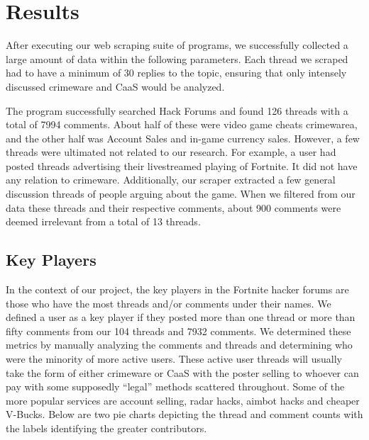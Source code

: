 \documentclass[sigconf]{acmart}
\begin{document}
\section{Results}

After executing our web scraping suite of programs, we successfully collected
a large amount of data within the following parameters. Each thread we scraped
had to have a minimum of 30 replies to the topic, ensuring that only intensely
discussed crimeware and CaaS would be analyzed. 

The program successfully searched Hack Forums and found 126 threads with a total
of 7994 comments. About half of these were video game cheats crimewarea, and the
other half was Account Sales and in-game currency sales. However, a few threads 
were ultimated not related to our research. For example, a user had posted
threads advertising their livestreamed playing of Fortnite. It did not have
any relation to crimeware. Additionally, our scraper extracted a few general
discussion threads of people arguing about the game. When we filtered from our
data these threads and their respective comments, about 900 comments were deemed
irrelevant from a total of 13 threads.

\subsection{Key Players}
In the context of our project, the key players in the Fortnite hacker forums are those who have the most threads and/or comments under their names. We defined a user as a key player if they posted more than one thread or more than fifty comments from our 104 threads and 7932 comments. We determined these metrics by manually analyzing the comments and threads and determining who were the minority of more active users. These active user threads will usually take the form of either crimeware or CaaS with the poster selling to whoever can pay with some supposedly “legal” methods scattered throughout. Some of the more popular services are account selling, radar hacks, aimbot hacks and cheaper V-Bucks. Below are two pie charts depicting the thread and comment counts with the labels identifying the greater contributors.
\end{document}
